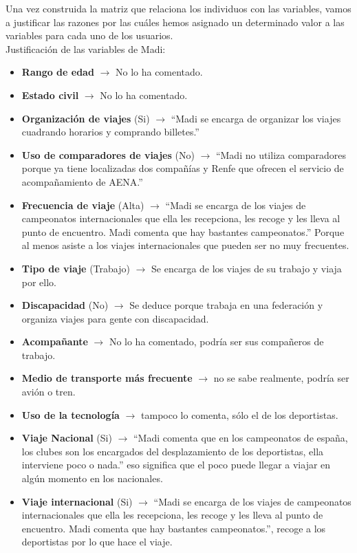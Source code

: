 Una vez construida la matriz que relaciona los individuos con las variables, vamos a justificar las razones por las cuáles hemos asignado un
determinado valor a las variables para cada uno de los usuarios. \\

\noindent Justificación de las variables de Madi:
\begin{itemize}
    \item \textbf{Rango de edad} $\rightarrow$ No lo ha comentado.
    \item \textbf{Estado civil} $\rightarrow$ No lo ha comentado.
    \item \textbf{Organización de viajes} (Si) $\rightarrow$ “Madi se encarga de organizar los viajes cuadrando horarios y comprando billetes.”
    \item \textbf{Uso de comparadores de viajes} (No) $\rightarrow$ “Madi no utiliza comparadores porque ya tiene localizadas dos compañías y Renfe que ofrecen el servicio de acompañamiento de AENA.”
    \item \textbf{Frecuencia de viaje} (Alta) $\rightarrow$ “Madi se encarga de los viajes de campeonatos internacionales que ella les recepciona, les recoge y les lleva al punto de encuentro. Madi comenta que hay bastantes campeonatos.” Porque al menos asiste a los viajes internacionales que pueden ser no muy frecuentes.
    \item \textbf{Tipo de viaje} (Trabajo) $\rightarrow$ Se encarga de los viajes de su trabajo y viaja por ello.
    \item \textbf{Discapacidad} (No) $\rightarrow$ Se deduce porque trabaja en una federación y organiza viajes para gente con discapacidad.
    \item \textbf{Acompañante} $\rightarrow$ No lo ha comentado, podría ser sus compañeros de trabajo.
    \item \textbf{Medio de transporte más frecuente} $\rightarrow$ no se sabe realmente, podría ser avión o tren.
    \item \textbf{Uso de la tecnología} $\rightarrow$ tampoco lo comenta, sólo el de los deportistas.
    \item \textbf{Viaje Nacional} (Si) $\rightarrow$ “Madi comenta que en los campeonatos de españa, los clubes son los encargados del desplazamiento de los deportistas, ella interviene poco o nada.” eso significa que el poco puede llegar a viajar en algún momento en los nacionales.
    \item \textbf{Viaje internacional} (Si) $\rightarrow$ “Madi se encarga de los viajes de campeonatos internacionales que ella les recepciona, les recoge y les lleva al punto de encuentro. Madi comenta que hay bastantes campeonatos.”, recoge a los deportistas por lo que hace el viaje.

\end{itemize}
